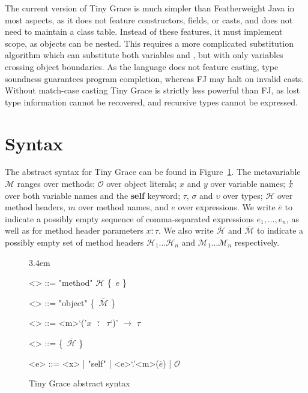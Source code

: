 \documentclass[a4paper, 11pt]{article}
\def\H{\mathcal{H}}
\def\M{\mathcal{M}}
\def\O{\mathcal{O}}
\def\bo{{\sffamily\upshape\{}}
\def\bc{{\sffamily\upshape\}}}
\newcommand{\key}[1]{{\sffamily\bfseries#1}}
\newcommand{\self}{\text{\key{self}}}
\def\xs{\overset{_\text{\sffamily\bfseries s}}x}
\theoremstyle{theorem}
\theoremstyle{lemma}
\theoremstyle{tproof}
\theoremstyle{lproof}
\theoremstyle{tcase}
\theoremstyle{lcase}
\begin{document}
\noindent The current version of Tiny Grace is much simpler than Featherweight
Java in most aspects, as it does not feature constructors, fields, or casts, and
does not need to maintain a class table.  Instead of these features, it must
implement scope, as objects can be nested.  This requires a more complicated
substitution algorithm which can substitute both variables and \self, but with
only variables crossing object boundaries.  As the language does not feature
casting, type soundness guarantees program completion, whereas FJ may halt on
invalid casts.  Without match-case casting Tiny Grace is strictly less powerful
than FJ, as lost type information cannot be recovered, and recursive types
cannot be expressed.


\section{Syntax}

\def\*#1*{$\overline{#1}$}

The abstract syntax for Tiny Grace can be found in
Figure~\ref{fig:abstract-syntax}.  The metavariable $\M$ ranges over methods;
$\O$ over object literals; $x$ and $y$ over variable names; $\xs$ over both
variable names and the {\sffamily\bfseries self} keyword; $\tau$, $\sigma$ and
$\upsilon$ over types; $\H$ over method headers, $m$ over method names, and $e$
over expressions.  We write \*e* to indicate a possibly empty sequence of
comma-separated expressions $e_1, \dots, e_n$, as well as for method header
parameters \*x : \tau*.  We also write \*\H* and \*\M* to indicate a possibly
empty set of method headers $\H_1 \dots \H_n$ and $\M_1 \dots \M_n$
respectively.

\begin{figure}
\centering

\def\*#1*{$\overline{\text{#1}}$}
\def\<#1>{$#1$}

\grammarindent3.4em
\renewcommand{\grammarlabel}[2]{$#1$\hfill#2}
\renewcommand{\syntleft}{\itshape}
\renewcommand{\syntright}{}
\renewcommand{\ulitleft}{\sffamily\bfseries}
\renewcommand{\litleft}{\sffamily}
\renewcommand{\litright}{}

\begin{grammar}
<\M> ::= "method" $\H$ \bo~\<e> \bc

<\O> ::= "object" \bo~\*$\M$* \bc

<\H> ::= <m>`('\*\<x> $:$ $\tau$*`)' $\to$ $\tau$

<\tau> ::= \bo~\*$\H$* \bc

<e> ::= <x> | "self" | <e>`.'<m>(\*\<e>*) | $\O$
\end{grammar}

\caption{Tiny Grace abstract syntax}
\label{fig:abstract-syntax}

\end{figure}
\end{document}
